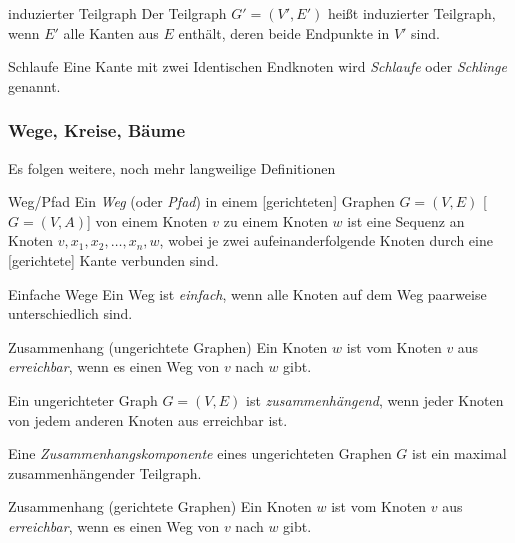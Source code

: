 \documentclass{panikzettel}
\begin{document}
{\begin{thirdboxr}
\begin{defi}{induzierter Teilgraph}
		Der Teilgraph $G' = (V',E')$ heißt induzierter Teilgraph, wenn $E'$ alle Kanten aus $E$ enthält, deren beide Endpunkte in $V'$ sind.
	\end{defi}
	
	\begin{defi}{Schlaufe}
		Eine Kante mit zwei Identischen Endknoten wird \emph{Schlaufe} oder \emph{Schlinge} genannt.
	\end{defi}
	
\end{thirdboxr}

\subsubsection{Wege, Kreise, Bäume}

Es folgen weitere, noch mehr langweilige Definitionen

\begin{thirdboxl}
	\vspace{-\baselineskip}	
	\begin{defi}{Weg/Pfad}
		Ein \emph{Weg} (oder \emph{Pfad}) in einem [gerichteten] Graphen $G = (V,E)$ [$G = (V,A)$] von einem Knoten $v$ zu einem Knoten $w$ ist eine Sequenz an Knoten $v, x_1, x_2, \dots , x_n, w$, wobei je zwei aufeinanderfolgende Knoten durch eine [gerichtete] Kante verbunden sind.
	\end{defi}
	
	\begin{defi}{Einfache Wege}
		Ein Weg ist \emph{einfach}, wenn alle Knoten auf dem Weg paarweise unterschiedlich sind.
	\end{defi}
\end{thirdboxl}%
\begin{thirdboxm}
	\vspace{-\baselineskip}		
	\begin{defi}{Zusammenhang (ungerichtete Graphen)}
		Ein Knoten $w$ ist vom Knoten $v$ aus \emph{erreichbar}, wenn es einen Weg von $v$ nach $w$ gibt.
		
		Ein ungerichteter Graph $G= (V,E)$ ist \emph{zusammenhängend}, wenn jeder Knoten von jedem anderen Knoten aus erreichbar ist.
		
		Eine \emph{Zusammenhangskomponente} eines ungerichteten Graphen $G$ ist ein maximal zusammenhängender Teilgraph.
	\end{defi}
	
\end{thirdboxm}%
\begin{thirdboxr}
	\vspace{-\baselineskip}	
	\begin{defi}{Zusammenhang (gerichtete Graphen)}
		Ein Knoten $w$ ist vom Knoten $v$ aus \emph{erreichbar}, wenn es einen Weg von $v$ nach $w$ gibt.
		

\end{defi}
\end{thirdboxr}}
\end{document}
